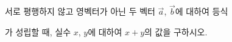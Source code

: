 서로 평행하지 않고 영벡터가 아닌 두 벡터 $\vec{a}$, $\vec{b}$에 대하여 등식 \par\smallskip{}\par\smallskip\noindent 가 성립할 때, 실수 $x$, $y$에 대하여 $x+y$의 값을 구하시오.
